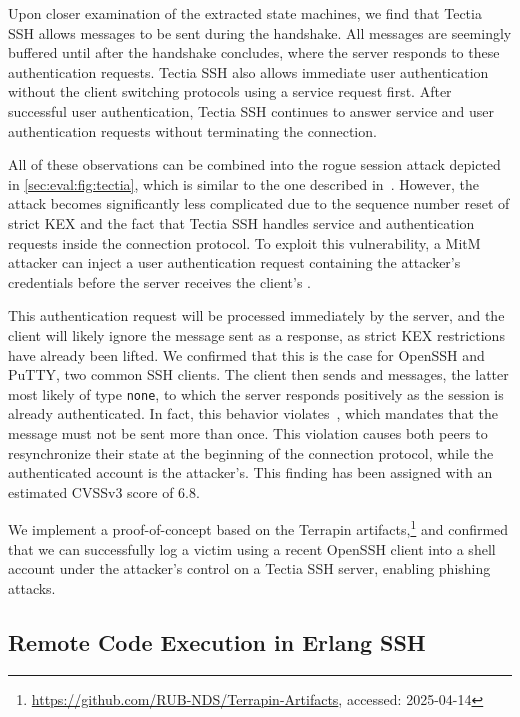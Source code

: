 Upon closer examination of the extracted state machines, we find that Tectia SSH allows \msguserauthrequest messages to be sent during the handshake. All \msguserauthrequest messages are seemingly buffered until after the handshake concludes, where the server responds to these authentication requests. Tectia SSH also allows immediate user authentication without the client switching protocols using a service request first. After successful user authentication, Tectia SSH continues to answer service and user authentication requests without terminating the connection.

All of these observations can be combined into the rogue session attack depicted in \autoref{sec:eval:fig:tectia}, which is similar to the one described in~\cite[Section~6.2]{USENIX:BauBriSch24}. However, the attack becomes significantly less complicated due to the sequence number reset of strict KEX and the fact that Tectia SSH handles service and authentication requests inside the connection protocol. To exploit this vulnerability, a MitM attacker can inject a user authentication request containing the attacker's credentials before the server receives the client's \msgnewkeys.

This authentication request will be processed immediately by the server, and the client will likely ignore the \msguserauthsuccess message sent as a response, as strict KEX restrictions have already been lifted. We confirmed that this is the case for OpenSSH and PuTTY, two common SSH clients. The client then sends \msgservicerequest and \msguserauthrequest messages, the latter most likely of type \texttt{none}, to which the server responds positively as the session is already authenticated. In fact, this behavior violates~\cite[Section 5.1]{rfc4252}, which mandates that the \msguserauthsuccess message must not be sent more than once. This violation causes both peers to resynchronize their state at the beginning of the connection protocol, while the authenticated account is the attacker's. This finding has been assigned \tectiacve with an estimated CVSSv3 score of 6.8.

We implement a proof-of-concept based on the Terrapin artifacts,\footnote{\url{https://github.com/RUB-NDS/Terrapin-Artifacts}, accessed: 2025-04-14} and confirmed that we can successfully log a victim using a recent OpenSSH client into a shell account under the attacker's control on a Tectia SSH server, enabling phishing attacks.

\subsection{Remote Code Execution in Erlang SSH}
\label{sec:eval:sub:erlang}

